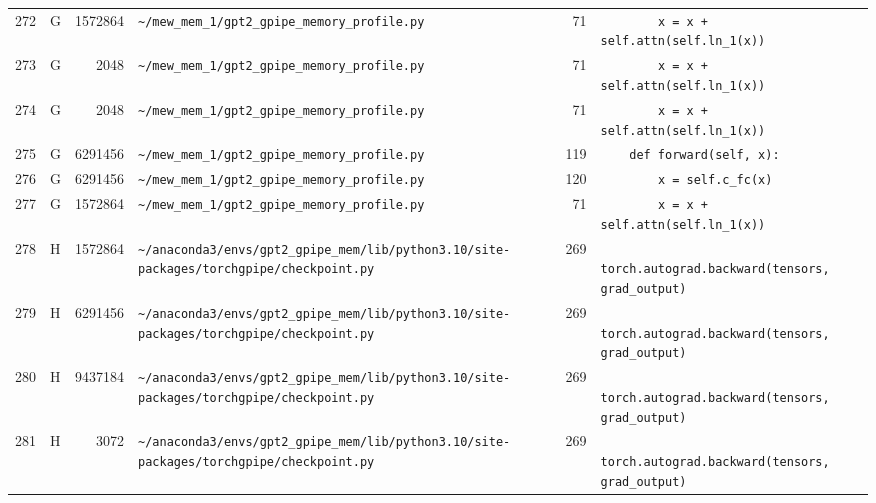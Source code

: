 \documentclass{article}
\begin{document}
\begin{longtable}{r l r p{6.5cm} r p{7.0cm}}
272 & G & 1572864 & \lstinline|~/mew_mem_1/gpt2_gpipe_memory_profile.py| & 71 & \lstinline|        x = x + self.attn(self.ln_1(x))| \\
273 & G & 2048 & \lstinline|~/mew_mem_1/gpt2_gpipe_memory_profile.py| & 71 & \lstinline|        x = x + self.attn(self.ln_1(x))| \\
274 & G & 2048 & \lstinline|~/mew_mem_1/gpt2_gpipe_memory_profile.py| & 71 & \lstinline|        x = x + self.attn(self.ln_1(x))| \\
275 & G & 6291456 & \lstinline|~/mew_mem_1/gpt2_gpipe_memory_profile.py| & 119 & \lstinline|    def forward(self, x):| \\
276 & G & 6291456 & \lstinline|~/mew_mem_1/gpt2_gpipe_memory_profile.py| & 120 & \lstinline|        x = self.c_fc(x)| \\
277 & G & 1572864 & \lstinline|~/mew_mem_1/gpt2_gpipe_memory_profile.py| & 71 & \lstinline|        x = x + self.attn(self.ln_1(x))| \\
278 & H & 1572864 & \lstinline|~/anaconda3/envs/gpt2_gpipe_mem/lib/python3.10/site-packages/torchgpipe/checkpoint.py| & 269 & \lstinline|            torch.autograd.backward(tensors, grad_output)| \\
279 & H & 6291456 & \lstinline|~/anaconda3/envs/gpt2_gpipe_mem/lib/python3.10/site-packages/torchgpipe/checkpoint.py| & 269 & \lstinline|            torch.autograd.backward(tensors, grad_output)| \\
280 & H & 9437184 & \lstinline|~/anaconda3/envs/gpt2_gpipe_mem/lib/python3.10/site-packages/torchgpipe/checkpoint.py| & 269 & \lstinline|            torch.autograd.backward(tensors, grad_output)| \\
281 & H & 3072 & \lstinline|~/anaconda3/envs/gpt2_gpipe_mem/lib/python3.10/site-packages/torchgpipe/checkpoint.py| & 269 & \lstinline|            torch.autograd.backward(tensors, grad_output)| \\
\end{longtable}
\end{document}
